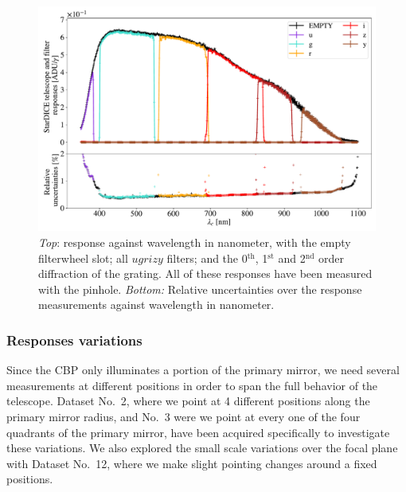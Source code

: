 \begin{figure}[h]
    \centering
    \includegraphics[width=\columnwidth]{fig/stardice_75um_response.pdf}
    \caption{\textit{Top}: \SD response against wavelength in nanometer, with the empty filterwheel slot; all $ugrizy$ filters; and the 0$^\mathrm{th}$, 1$^\mathrm{st}$ and 2$^\mathrm{nd}$ order diffraction of the grating. All of these responses have been measured with the \spinhole pinhole. \textit{Bottom:} Relative uncertainties over the \SD response measurements against wavelength in nanometer.}
    \label{fig:stardice_75um_response}
\end{figure}


\subsubsection{\SD Responses variations}

Since the CBP only illuminates a portion of the primary mirror, we need several measurements at different positions in order to span the full behavior of the \SD telescope. Dataset No.~2, where we point at 4 different positions along the primary mirror radius, and No.~3 were we point at every one of the four quadrants of the primary mirror, have been acquired specifically to investigate these variations. We also explored the small scale variations over the focal plane with Dataset No.~12, where we make slight pointing changes around a fixed positions.


